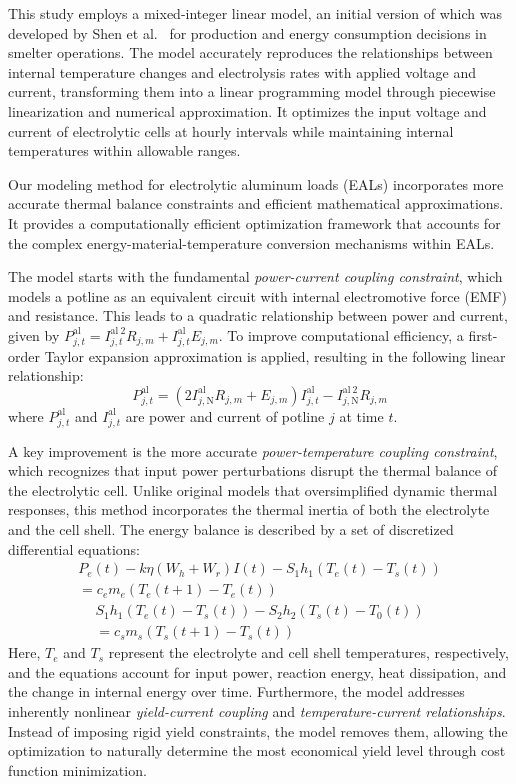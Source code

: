 \documentclass[preprint,12pt]{elsarticle}
\begin{document}
This study employs a mixed-integer linear model, an initial version of which was developed by Shen et al.~\citep{shen_improved_2025} for production and energy consumption decisions in smelter operations. The model accurately reproduces the relationships between internal temperature changes and electrolysis rates with applied voltage and current, transforming them into a linear programming model through piecewise linearization and numerical approximation. It optimizes the input voltage and current of electrolytic cells at hourly intervals while maintaining internal temperatures within allowable ranges.

Our modeling method for electrolytic aluminum loads (EALs) incorporates more accurate thermal balance constraints and efficient mathematical approximations. It provides a computationally efficient optimization framework that accounts for the complex energy-material-temperature conversion mechanisms within EALs.

The model starts with the fundamental \textit{power-current coupling constraint}, which models a potline as an equivalent circuit with internal electromotive force (EMF) and resistance.
This leads to a quadratic relationship between power and current, given by $P_{j,t}^{\mathrm{al}} = I_{j,t}^{\mathrm{al}~2} R_{j,m} + I_{j,t}^{\mathrm{al}} E_{j,m}$.
To improve computational efficiency, a first-order Taylor expansion approximation is applied, resulting in the following linear relationship:
\begin{equation}
P_{j,t}^{\mathrm{al}} = (2I_{j,\mathrm{N}}^{\mathrm{al}} R_{j,m} + E_{j,m}) I_{j,t}^{\mathrm{al}} - I_{j,\mathrm{N}}^{\mathrm{al}~2} R_{j,m}
\end{equation}
where $P_{j,t}^{\mathrm{al}}$ and $I_{j,t}^{\mathrm{al}}$ are power and current of potline $j$ at time $t$.

A key improvement is the more accurate \textit{power-temperature coupling constraint}, which recognizes that input power perturbations disrupt the thermal balance of the electrolytic cell.
Unlike original models that oversimplified dynamic thermal responses, this method incorporates the thermal inertia of both the electrolyte and the cell shell.
The energy balance is described by a set of discretized differential equations:
\begin{multline}
P_e(t) - k \eta (W_h + W_r) I(t) - S_1 h_1 (T_e(t) - T_s(t)) \\
= c_e m_e (T_e(t+1) - T_e(t))
\end{multline}
\begin{multline}
S_1 h_1 (T_e(t) - T_s(t)) - S_2 h_2 (T_s(t) - T_0(t)) \\
= c_s m_s (T_s(t+1) - T_s(t))
\end{multline}
Here, $T_e$ and $T_s$ represent the electrolyte and cell shell temperatures, respectively, and the equations account for input power, reaction energy, heat dissipation, and the change in internal energy over time.
Furthermore, the model addresses inherently nonlinear \textit{yield-current coupling} and \textit{temperature-current relationships}.
Instead of imposing rigid yield constraints, the model removes them, allowing the optimization to naturally determine the most economical yield level through cost function minimization.
\end{document}
